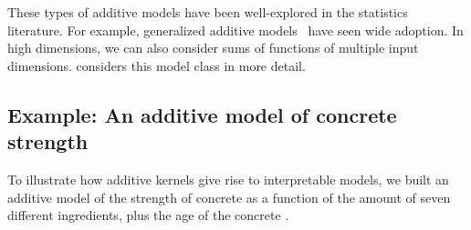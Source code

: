 These types of additive models have been well-explored in the statistics literature.
For example, generalized additive models~\citep{hastie1990generalized} have seen wide adoption.
In high dimensions, we can also consider sums of functions of multiple input dimensions.
 considers this model class in more detail.




\subsection{Example: An additive model of concrete strength}
\label{sec:concrete}

To illustrate how additive kernels give rise to interpretable models, we built an additive model of the strength of concrete as a function of the amount of seven different ingredients, plus the age of the concrete \citep{yeh1998modeling}.

